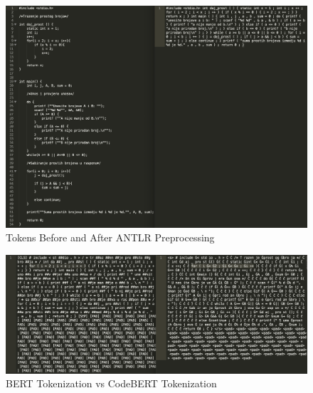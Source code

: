 \documentclass[twocolumn]{article}
\begin{document}
\begin{figure}[t!]
\centering
\caption{Tokens Before and After ANTLR Preprocessing}
\label{fig:beforeandafterANTLR}
\centering
\includegraphics[scale=0.45]{images/tokens_comparison.png}
\end{figure}

\begin{figure}[t!]
\centering
\caption{BERT Tokenization vs CodeBERT Tokenization}
\label{fig:BERTtokenizationvsCodeBERTtokenization}
\centering
\includegraphics[scale=0.45]{images/tokenization_bert_vs_codebert_highlighted.png}
\end{figure}
\end{document}
